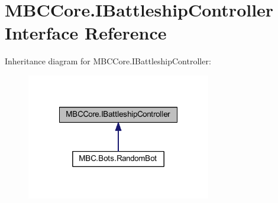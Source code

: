 \hypertarget{interface_m_b_c_core_1_1_i_battleship_controller}{\section{M\-B\-C\-Core.\-I\-Battleship\-Controller Interface Reference}
\label{interface_m_b_c_core_1_1_i_battleship_controller}
}


Inheritance diagram for M\-B\-C\-Core.\-I\-Battleship\-Controller\-:
\nopagebreak
\begin{figure}[H]
\begin{center}
\leavevmode
\includegraphics[width=228pt]{interface_m_b_c_core_1_1_i_battleship_controller__inherit__graph}
\end{center}
\end{figure}
